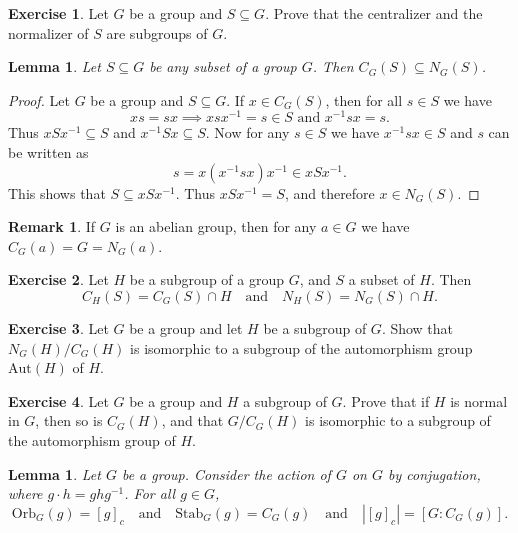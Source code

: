 \documentclass[12pt]{report}
\newtheorem{lemma}[theorem]{Lemma}
\numberwithin{equation}{section}
\numberwithin{theorem}{chapter}
\theoremstyle{definition}
\newtheorem{exercise}{Exercise}
\newtheorem*{basic properties}{Basic Properties}
\newtheorem*{Important Remark}{Important Remark}
\newtheorem{remark}[theorem]{Remark}
\begin{document}
\begin{exercise}
Let $G$ be a group and $S \subseteq G$. 
Prove that the centralizer and the normalizer of $S$ are subgroups of $G$.
\end{exercise}


\begin{lemma}
	Let $S \subseteq G$ be any subset of a group $G$. Then $C_G(S) \subseteq N_G(S)$.
\end{lemma}

\begin{proof}
	Let $G$ be a group and $S \subseteq G$. If $x \in C_G(S)$, then for all $s \in S$ we have
	$$xs=sx \implies xsx^{-1} = s \in S \textrm{ and } x^{-1}sx = s.$$
	Thus $xSx^{-1} \subseteq S$ and $x^{-1}Sx \subseteq S$.
	Now for any $s \in S$ we have $x^{-1}sx \in S$ and $s$ can be written as 
	$$s = x(x^{-1}sx)x^{-1} \in xSx^{-1}.$$ 
	This shows that $S \subseteq xSx^{-1}$. Thus $xSx^{-1} = S$, and therefore $x \in N_G(S)$.
\end{proof}

\begin{remark}
	If $G$ is an abelian group, then for any $a \in G$ we have $C_G(a) = G = N_G(a)$.
\end{remark}


\begin{exercise}\label{centralizer and normalizer in subgroup}
	Let $H$ be a subgroup of a group $G$, and $S$ a subset of $H$. Then 
	$$C_{H}(S) = C_G(S) \cap H \quad \textrm{and} \quad N_{H}(S) = N_G(S) \cap H.$$
\end{exercise}




\begin{exercise}
Let $G$ be a group and let $H$ be a subgroup of $G$. 
Show that $N_G(H)/C_G(H)$ is isomorphic to a subgroup of the automorphism group $\mathrm{Aut}(H)$ of $H$.
\end{exercise}


\begin{exercise}
Let $G$ be a group and $H$ a subgroup of $G$. Prove that if $H$ is normal in $G$, then so is $C_G(H)$, and that $G/C_G(H)$ is isomorphic to a subgroup of the automorphism group of $H$.
\end{exercise}



\begin{lemma}\label{conjugacy class}
	Let $G$ be a group. Consider the action of $G$ on $G$ by conjugation, where $g \cdot h = ghg^{-1}$. For all $g \in G$, 
$$\mathrm{Orb}_G(g) = [g]_c \quad \textrm{and} \quad \mathrm{Stab}_G(g)=C_G(g) \quad \textrm{and} \quad |[g]_c| = [G : C_G(g)].$$
\end{lemma}
\end{document}
